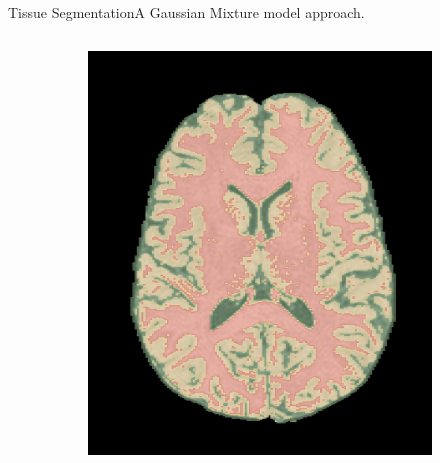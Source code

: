 \documentclass[]{standalone}
\begin{document}
\begin{frame}{Tissue Segmentation}{A Gaussian Mixture model approach.}
\begin{columns}
\begin{column}{0.7\textwidth}
\begin{figure}[h!]
\begin{subfigure}{0.45\textwidth}
					\includegraphics[scale=0.055]{./IMG/segmented_axial.jpg}
				\end{subfigure}
				\hfill
				\begin{subfigure}{0.45\textwidth}
					

\end{subfigure}
\end{figure}
\end{column}
\end{columns}
\end{frame}
\end{document}
